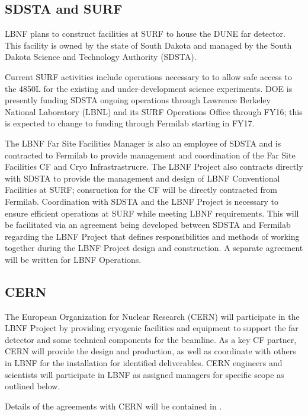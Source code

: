 \subsection{SDSTA and SURF}

LBNF plans to construct facilities at SURF to house the DUNE far detector. This facility is owned by the state of South Dakota and managed by the South Dakota Science and Technology Authority (SDSTA). 

Current SURF activities include operations necessary to to allow safe access to the 4850L for the existing and under-development science experiments. DOE is presently funding SDSTA ongoing operations through Lawrence Berkeley National Laboratory (LBNL) and its SURF Operations Office through FY16; this is expected to change to funding through Fermilab starting in FY17. 

The LBNF Far Site Facilities Manager is also an employee of SDSTA and is contracted to Fermilab to provide management and coordination of the Far Site Facilities CF and Cryo Infrastrastrucre. The LBNF Project also contracts directly with SDSTA to provide the management and design of LBNF Conventional Facilities at SURF; consruction for the CF will be directly contracted from Fermilab. Coordination with SDSTA and the LBNF Project is necessary to ensure efficient operations at SURF while meeting LBNF requirements. This will be facilitated via an agreement being developed between SDSTA and Fermilab regarding the LBNF Project  that defines responsibilities and methods of working together during the LBNF Project design and construction. A separate agreement will be written for LBNF Operations. 

\subsection{CERN}

The European Organization for Nuclear Research (CERN) will participate in the LBNF Project by providing cryogenic facilities and equipment to support the far detector and some technical components for the beamline. As a key CF %
partner, CERN will provide the design and production, as well as coordinate with others in LBNF for the installation for identified deliverables. CERN engineers and scientists will participate in LBNF as assigned managers for specific scope as outlined %
below. 

Details of the agreements with CERN will be contained in .  

